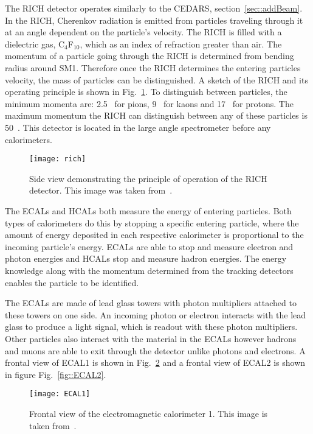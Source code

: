 The RICH detector operates similarly to the CEDARS, section~\ref{sec::addBeam}.
In the RICH, Cherenkov radiation is emitted from particles traveling through it
at an angle dependent on the particle's velocity.  The RICH is filled with a
dielectric gas, C$_4$F$_{10}$, which as an index of refraction greater than air.
The momentum of a particle going through the RICH is determined from bending
radius around SM1.  Therefore once the RICH determines the entering particles
velocity, the mass of particles can be distinguished.  A sketch of the RICH and
its operating principle is shown in Fig.~\ref{fig::rich}.  To distinguish
between particles, the minimum momenta are: 2.5~{\gvc} for pions, 9~{\gvc}
for kaons and 17~{\gvc} for protons.  The maximum momentum the RICH can
distinguish between any of these particles is 50~{\gvc}. This detector is
located in the large angle spectrometer before any calorimeters.\par

\begin{figure}[h!t]
  \centering
  \texttt{[image: rich]}
  \caption{Side view demonstrating the principle of operation of the RICH
    detector.  This image was taken from~\cite{compassSpec}.}
  \label{fig::rich}
\end{figure}

The ECALs and HCALs both measure the energy of entering particles.  Both types
of calorimeters do this by stopping a specific entering particle, where the
amount of energy deposited in each respective calorimeter is proportional to the
incoming particle's energy.  ECALs are able to stop and measure electron and
photon energies and HCALs stop and measure hadron energies.  The energy
knowledge along with the momentum determined from the tracking detectors enables
the particle to be identified. \par

The ECALs are made of lead glass towers with photon multipliers attached to
these towers on one side.  An incoming photon or electron interacts with the
lead glass to produce a light signal, which is readout with these photon
multipliers.  Other particles also interact with the material in the ECALs
however hadrons and muons are able to exit through the detector unlike photons
and electrons.  A frontal view of ECAL1 is shown in Fig.~\ref{fig::ECAL1} and a
frontal view of ECAL2 is shown in figure Fig.~\ref{fig::ECAL2}. \par

\begin{figure}[h!t]
  \centering
  \texttt{[image: ECAL1]}
  \caption{Frontal view of the electromagnetic calorimeter 1.  This image is
    taken from~\cite{ABBON201569}.}
  \label{fig::ECAL1}
\end{figure}

